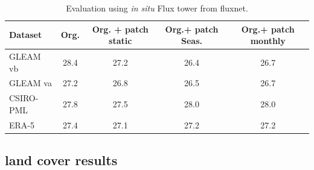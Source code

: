 \documentclass[draft]{agujournal2019}
\begin{document}
\begin{table}[h]
\centering
\begin{scriptsize}
\begin{tabular} {l c c c c}
\hline
Dataset & Org. &   Org. + patch static &  Org.+ patch Seas. &  Org.+ patch monthly \\
\hline 
 GLEAM vb &   28.4 &  27.2  & 26.4  & 26.7\\
 GLEAM va &  27.2  & 26.8 &  26.5  & 26.7\\
 CSIRO-PML &  27.8  & 27.5  & 28.0  & 28.0\\
 ERA-5 & 27.4  & 27.1  & 27.2  & 27.2\\
\hline 
\end{tabular}
\end{scriptsize}
\caption{Evaluation using {\it in situ} Flux tower from fluxnet.}
\label{table1}
\end{table}


\subsection{land cover results}
\end{document}
